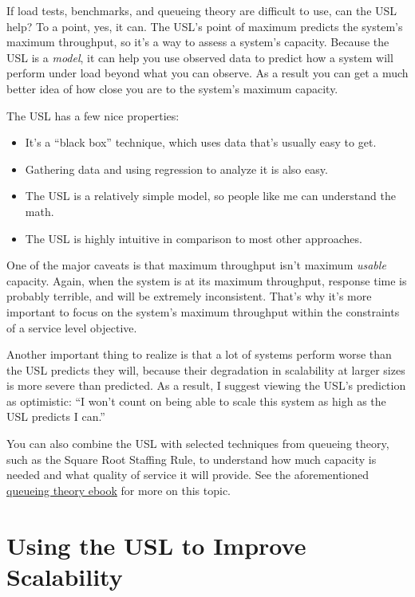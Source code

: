 \documentclass{vivid_layout}
\begin{document}
If load tests, benchmarks, and queueing theory are difficult to use, can the USL
help? To a point, yes, it can.  The USL's point of maximum predicts the system's
maximum throughput, so it's a way to assess a system's capacity.  Because the
USL is a {\itshape model}, it can help you use observed data to predict how a
system will perform under load beyond what you can observe. As a result you can
get a much better idea of how close you are to the system's maximum capacity.

The USL has a few nice properties:

\begin{itemize}
\item It's a ``black box'' technique, which uses data that's usually easy to get.
\item Gathering data and using regression to analyze it is also easy.
\item The USL is a relatively simple model, so people like me can understand the math. 
\item The USL is highly intuitive in comparison to most other approaches.
\end{itemize}

One of the major caveats is that maximum throughput isn't maximum {\itshape
usable} capacity. Again, when the system is at its maximum throughput, response
time is probably terrible, and will be extremely inconsistent. That's why it's
more important to focus on the system's maximum throughput within the
constraints of a service level objective.

Another important thing to realize is that a lot of systems perform worse than
the USL predicts they will, because their degradation in scalability at larger
sizes is more severe than predicted. As a result, I suggest viewing the USL's
prediction as optimistic: ``I won't count on being able to scale this system as
high as the USL predicts I can.''

You can also combine the USL with selected techniques from queueing theory, such
as the Square Root Staffing Rule, to understand how much capacity is needed and
what quality of service it will provide. See the aforementioned
\href{https://www.vividcortex.com/resources/queueing-theory/}{queueing theory
ebook} for more on this topic.

\section{Using the USL to Improve Scalability}
\end{document}
